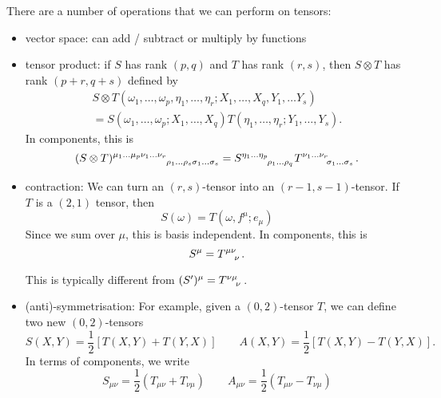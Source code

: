 There are a number of operations that we can perform on tensors:
\begin{itemize}
  \item vector space: can add / subtract or multiply by functions
  \item tensor product: if $S$ has rank $(p, q)$ and $T$ has rank $(r, s)$, then $S \otimes T$ has rank $(p + r, q + s)$ defined by
    \begin{multline}
      S \otimes T(\omega_1, \dots, \omega_p, \eta_1, \dots, \eta_r; X_1, \dots, X_q, Y_1, \dots Y_s) \\
      = S (\omega_1, \dots, \omega_p; X_1, \dots, X_q) T(\eta_1, \dots, \eta_r; Y_1, \dots, Y_s).
    \end{multline}
    In components, this is
    \begin{equation}
      (S \otimes T) \indices{^{\mu_1 \dots \mu_p \nu_1 \dots \nu_r}_{\rho_1 \dots \rho_s \sigma_1 \dots \sigma_s}} = S \indices{^{\eta_1 \dots \eta_p}_{\rho_1 \dots \rho_q}} T \indices{ ^{\nu_1 \dots \nu_r}_{\sigma_1 \dots \sigma_s}}.
    \end{equation}
  \item contraction: We can turn an $(r, s)$-tensor into an $(r-1, s-1)$-tensor. If $T$ is a $(2,1)$ tensor, then
    \begin{equation}
      S(\omega) = T(\omega, f^\mu; e_\mu)
    \end{equation}
    Since we sum over $\mu$, this is basis independent.
    In components, this is
    \begin{equation}
      S^\mu = T \indices{^\mu^\nu_\nu}.
    \end{equation}
    \begin{remark}
      This is typically different from $(S')^\mu = T \indices{^\nu^\mu _\nu}$.
    \end{remark}
  \item (anti)-symmetrisation: For example, given a $(0,2)$-tensor $T$, we can define two new $(0, 2)$-tensors
    \begin{equation}
      S(X, Y) = \frac{1}{2} \left[ T(X, Y) + T(Y, X) \right] \qquad
      A(X, Y) = \frac{1}{2} \left[ T(X, Y) - T(Y, X) \right].
    \end{equation}
    In terms of components, we write
    \begin{equation}
      S_{\mu\nu} = \frac{1}{2} (T_{\mu\nu} + T_{\nu\mu}) \qquad
      A_{\mu\nu} = \frac{1}{2} (T_{\mu\nu} - T_{\nu\mu})
    \end{equation}
    \begin{leftbar}

\end{leftbar}
\end{itemize}
